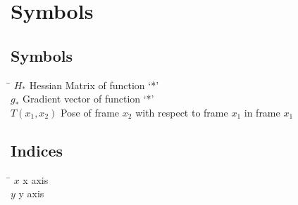 \chapter*{Symbols}
\label{sec:symbols}

\section*{Symbols}

\begin{tabbing}
 \hspace*{1.6cm} \= \kill
  $H_*$    \> Hessian Matrix of function `*'\\[0.5ex] 					
  $g_*$                     \> Gradient vector of function `*'\\[0.5ex]										
  $T(x_1, x_2)$             \> Pose of frame $x_2$ with respect to frame $x_1$ in frame $x_1$ \\[0.5ex]   		
\end{tabbing}

\section*{Indices}
\begin{tabbing}
 \hspace*{1.6cm}  \= \kill
 $x$ \> x axis \\[0.5ex]
 $y$ \> y axis \\[0.5ex]
\end{tabbing}


